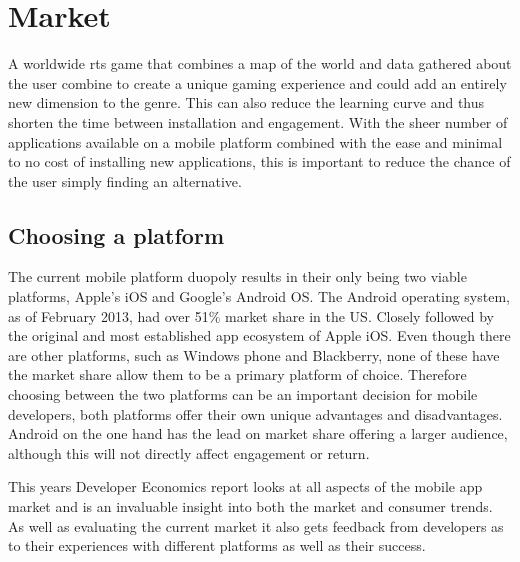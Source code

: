 \section{Market}

A worldwide \gls{rts} game that combines a map of the world and data gathered about the user combine to create a unique gaming experience and could add an entirely new dimension to the genre. This can also reduce the learning curve and thus shorten the time between installation and engagement. With the sheer number of applications available on a mobile platform combined with the ease and minimal to no cost of installing new applications, this is important to reduce the chance of the user simply finding an alternative.

\subsection{Choosing a platform}
The current mobile platform duopoly results in their only being two viable platforms, Apple's iOS and Google's Android OS. The Android operating system, as of February 2013, had over 51\% market share in the US\cite{smartphone_market}. Closely followed by the original and most established app ecosystem of Apple iOS. Even though there are other platforms, such as Windows phone and Blackberry, none of these have the market share allow them to be a primary platform of choice. Therefore choosing between the two platforms can be an important decision for mobile developers, both platforms offer their own unique advantages and disadvantages. Android on the one hand has the lead on market share offering a larger audience, although this will not directly affect engagement or return.

This years Developer Economics report\cite{de} looks at all aspects of the mobile app market and is an invaluable insight into both the market and consumer trends. As well as evaluating the current market it also gets feedback from developers as to their experiences with different platforms as well as their success.

